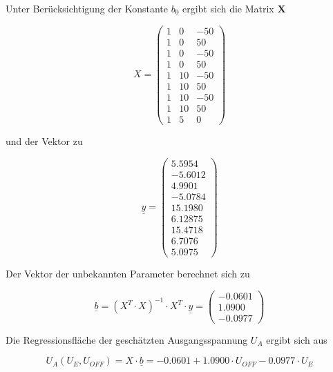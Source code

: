 \noindent Unter Ber\"{u}cksichtigung der Konstante $b_{0}$ ergibt sich die Matrix \textbf{X} 

\begin{equation}\label{eq:thirteenfourteen}
X=\left(\begin{array}{ccc} {1} & {0} & {-50} \\ {1} & {0} & {50} \\ {1} & {0} & {-50} \\ {1} & {0} & {50} \\ {1} & {10} & {-50} \\ {1} & {10} & {50} \\ {1} & {10} & {-50} \\ {1} & {10} & {50} \\ {1} & {5} & {0} \end{array}\right)
\end{equation}

\noindent und der Vektor  zu

\begin{equation}\label{eq:thirteenfifteen}
\underline{y}=\left(\begin{array}{c} {5.5954} \\ {-5.6012} \\ {4.9901} \\ {-5.0784} \\ {15.1980} \\ {6.12875} \\ {15.4718} \\ {6.7076} \\ {5.0975} \end{array}\right)
\end{equation}

\noindent Der Vektor  der unbekannten Parameter berechnet sich zu

\begin{equation}\label{eq:thirteensixteen}
\underline{b}=\left(X^{T} \cdot X\right)^{-1} \cdot X^{T} \cdot \underline{y}=\left(\begin{array}{c} {-0.0601} \\ {1.0900} \\ {-0.0977} \end{array}\right)
\end{equation}

\noindent Die Regressionsfl\"{a}che der gesch\"{a}tzten Ausgangsspannung $U_{A}$ ergibt sich aus 

\begin{equation}\label{eq:thirteenseventeen}
U_{A} \left(U_{E} ,U_{OFF} \right)=X\cdot \underline{b}=-0.0601+1.0900\cdot U_{OFF} -0.0977\cdot U_{E}
\end{equation}

